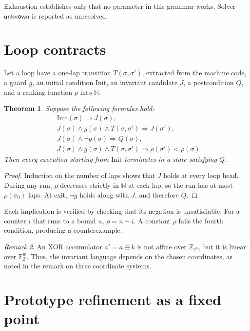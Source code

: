 \documentclass[11pt]{article}
\newtheorem{theorem}{Theorem}[section]
\theoremstyle{definition}
\theoremstyle{remark}
\newtheorem{remark}[theorem]{Remark}
\newcommand{\Z}{\mathbb{Z}}
\newcommand{\N}{\mathbb{N}}
\newcommand{\F}{\mathbb{F}}
\begin{document}
Exhaustion establishes only that no parameter in this grammar works. Solver $\mathsf{unknown}$ is reported as unresolved.

\section{Loop contracts}\label{sec:loops}

Let a loop have a one-lap transition $T(\sigma, \sigma')$, extracted from the machine code, a guard $g$, an initial condition $\mathrm{Init}$, an invariant candidate $J$, a postcondition $Q$, and a ranking function $\rho$ into $\N$.

\begin{theorem}
Suppose the following formulas hold:
\begin{align*}
  &\mathrm{Init}(\sigma) \Rightarrow J(\sigma), \\
  &J(\sigma) \wedge g(\sigma) \wedge T(\sigma,\sigma') \Rightarrow J(\sigma'), \\
  &J(\sigma) \wedge \neg g(\sigma) \Rightarrow Q(\sigma), \\
  &J(\sigma) \wedge g(\sigma) \wedge T(\sigma,\sigma') \Rightarrow \rho(\sigma') < \rho(\sigma).
\end{align*}
Then every execution starting from $\mathrm{Init}$ terminates in a state satisfying $Q$.
\end{theorem}

\begin{proof}
Induction on the number of laps shows that $J$ holds at every loop head. During any run, $\rho$ decreases strictly in $\N$ at each lap, so the run has at most $\rho(\sigma_0)$ laps. At exit, $\neg g$ holds along with $J$, and therefore $Q$.
\end{proof}

Each implication is verified by checking that its negation is unsatisfiable. For a counter $i$ that runs to a bound $n$, $\rho = n - i$. A constant $\rho$ fails the fourth condition, producing a counterexample.

\begin{remark}
An XOR accumulator $a' = a \oplus k$ is not affine over $\Z_{2^w}$, but it is linear over $\F_2^w$. Thus, the invariant language depends on the chosen coordinates, as noted in the remark on three coordinate systems.
\end{remark}

\section{Prototype refinement as a fixed point}
\end{document}
